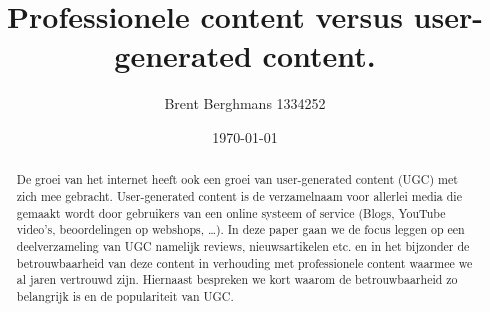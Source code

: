 \documentclass[a4paper]{article}
\title{Professionele content versus user-generated content.}
\author{Brent Berghmans 1334252}
\date{\today}
\begin{document}
\maketitle
\begin{abstract}De groei van het internet heeft ook een groei van user-generated content (UGC) met zich mee gebracht. User-generated content is de verzamelnaam voor allerlei media die gemaakt wordt door gebruikers van een online systeem of service (Blogs, YouTube video’s, beoordelingen op webshops, …). In deze paper gaan we de focus leggen op een deelverzameling van UGC namelijk reviews, nieuwsartikelen etc. en in het bijzonder de betrouwbaarheid van deze content in verhouding met professionele content waarmee we al jaren vertrouwd zijn. Hiernaast bespreken we kort waarom de betrouwbaarheid zo belangrijk is en de populariteit van UGC.
\end{abstract}
\end{document}
